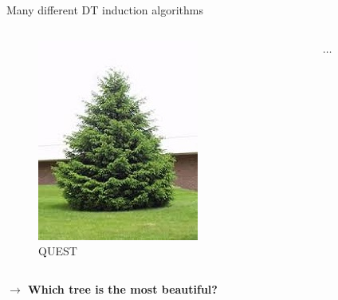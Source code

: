 \documentclass[english]{beamer}
\begin{document}
\begin{frame}{Many different DT induction algorithms}
\begin{columns}
\begin{column}{0.25\textwidth}
\begin{figure}
				\includegraphics[width=\textwidth]{figures/spar.jpg}
				\caption{QUEST}
			\end{figure}
		\end{column}
		\begin{column}{0.25\textwidth}
			\centering
			$\ldots$
		\end{column}
	\end{columns}
	
	\textbf{$\rightarrow$ Which tree is the most beautiful?}
\end{frame}
\end{document}
